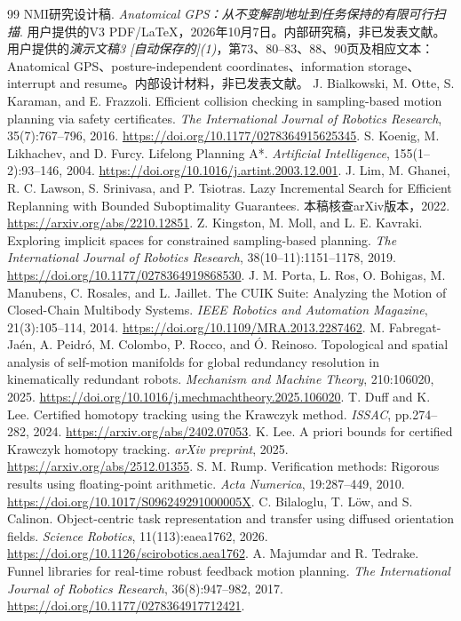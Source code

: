 \documentclass[UTF8,11pt,a4paper,fontset=fandol]{ctexart}
\numberwithin{equation}{section}
\theoremstyle{definition}
\begin{document}
\begin{thebibliography}{99}
 NMI研究设计稿. \emph{Anatomical GPS：从不变解剖地址到任务保持的有限可行扫描}. 用户提供的V3 PDF/LaTeX，2026年10月7日。内部研究稿，非已发表文献。
 用户提供的\emph{演示文稿3 [自动保存的](1)}，第73、80--83、88、90页及相应文本：Anatomical GPS、posture-independent coordinates、information storage、interrupt and resume。内部设计材料，非已发表文献。
 J. Bialkowski, M. Otte, S. Karaman, and E. Frazzoli. Efficient collision checking in sampling-based motion planning via safety certificates. \emph{The International Journal of Robotics Research}, 35(7):767--796, 2016. \url{https://doi.org/10.1177/0278364915625345}.
 S. Koenig, M. Likhachev, and D. Furcy. Lifelong Planning A*. \emph{Artificial Intelligence}, 155(1--2):93--146, 2004. \url{https://doi.org/10.1016/j.artint.2003.12.001}.
 J. Lim, M. Ghanei, R. C. Lawson, S. Srinivasa, and P. Tsiotras. Lazy Incremental Search for Efficient Replanning with Bounded Suboptimality Guarantees. 本稿核查arXiv版本，2022. \url{https://arxiv.org/abs/2210.12851}.
 Z. Kingston, M. Moll, and L. E. Kavraki. Exploring implicit spaces for constrained sampling-based planning. \emph{The International Journal of Robotics Research}, 38(10--11):1151--1178, 2019. \url{https://doi.org/10.1177/0278364919868530}.
 J. M. Porta, L. Ros, O. Bohigas, M. Manubens, C. Rosales, and L. Jaillet. The CUIK Suite: Analyzing the Motion of Closed-Chain Multibody Systems. \emph{IEEE Robotics and Automation Magazine}, 21(3):105--114, 2014. \url{https://doi.org/10.1109/MRA.2013.2287462}.
 M. Fabregat-Ja\'en, A. Peidr\'o, M. Colombo, P. Rocco, and \'O. Reinoso. Topological and spatial analysis of self-motion manifolds for global redundancy resolution in kinematically redundant robots. \emph{Mechanism and Machine Theory}, 210:106020, 2025. \url{https://doi.org/10.1016/j.mechmachtheory.2025.106020}.
 T. Duff and K. Lee. Certified homotopy tracking using the Krawczyk method. \emph{ISSAC}, pp.274--282, 2024. \url{https://arxiv.org/abs/2402.07053}.
 K. Lee. A priori bounds for certified Krawczyk homotopy tracking. \emph{arXiv preprint}, 2025. \url{https://arxiv.org/abs/2512.01355}.
 S. M. Rump. Verification methods: Rigorous results using floating-point arithmetic. \emph{Acta Numerica}, 19:287--449, 2010. \url{https://doi.org/10.1017/S096249291000005X}.
 C. Bilaloglu, T. L\"ow, and S. Calinon. Object-centric task representation and transfer using diffused orientation fields. \emph{Science Robotics}, 11(113):eaea1762, 2026. \url{https://doi.org/10.1126/scirobotics.aea1762}.
 A. Majumdar and R. Tedrake. Funnel libraries for real-time robust feedback motion planning. \emph{The International Journal of Robotics Research}, 36(8):947--982, 2017. \url{https://doi.org/10.1177/0278364917712421}.
\end{thebibliography}
\end{document}
